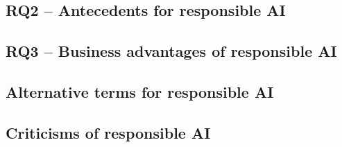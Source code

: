 
\subsection{RQ2 -- Antecedents for responsible AI}
\label{sec:results-rq2:antecedents}

\subsection{RQ3 -- Business advantages of responsible AI}
\label{sec:results-rq3:advantages}



\subsection{Alternative terms for responsible AI}
\label{sec:results-alernative-terms}

\subsection{Criticisms of responsible AI}
\label{sec:results-criticism}
